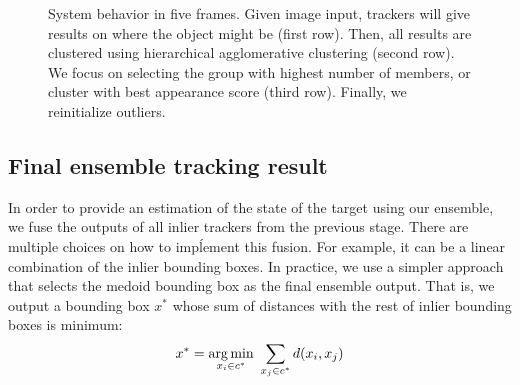 \begin{figure}[t!]
\centering

    \vspace{0.15cm}


    \vspace{0.15cm}



\caption{\small System behavior in five frames. Given image input, trackers will
give results on where the object might be (first row). Then, all results are
clustered using hierarchical agglomerative clustering (second row). We focus on
selecting the group with highest number of members, or cluster with best
appearance score (third row). Finally, we reinitialize outliers.}   
\end{figure}


\subsection{Final ensemble tracking result}
In order to provide an estimation of the state of the target using our
ensemble, we fuse the outputs of all inlier trackers from the previous stage.
There are multiple choices on how to impĺement this fusion. For example,
it can be a linear combination of the inlier bounding boxes. In practice,
we use a simpler approach that selects the medoid bounding box as the final
ensemble output. That is, we output a
bounding box $x^{*}$
whose sum of distances with the rest of inlier bounding boxes
is minimum:
\begin{equation}
x^{*} = \operatorname*{arg\,min}_{x_{i} \in c^*}  ~\sum_{x_{j} \in c^{*}}d(x_{i}, x_{j}) 
\end{equation}

